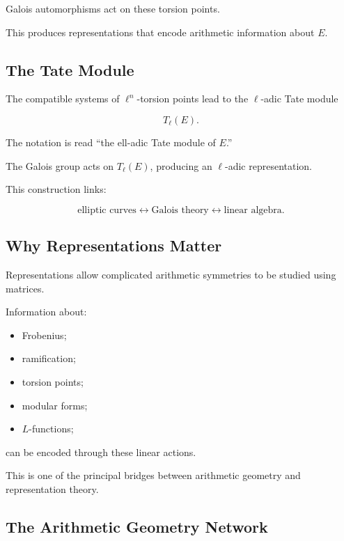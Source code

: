Galois automorphisms act on these torsion points.

This produces representations that encode arithmetic information about
\(E\).

\subsection{The Tate Module}
\label{subsec:tate-module-introduction}

The compatible systems of \(\ell^n\)-torsion points lead to the
\(\ell\)-adic Tate module

\[ T_\ell(E). \]

The notation is read ``the ell-adic Tate module of \(E\).''

The Galois group acts on \(T_\ell(E)\), producing an \(\ell\)-adic
representation.

This construction links:

\[
\boxed{
\text{elliptic curves}
\longleftrightarrow
\text{Galois theory}
\longleftrightarrow
\text{linear algebra}.
}
\]

\subsection{Why Representations Matter}
\label{subsec:why-galois-representations-matter}

Representations allow complicated arithmetic symmetries to be studied using
matrices.

Information about:

\begin{itemize}
    \item Frobenius;
    \item ramification;
    \item torsion points;
    \item modular forms;
    \item \(L\)-functions;
\end{itemize}

can be encoded through these linear actions.

This is one of the principal bridges between arithmetic geometry and
representation theory.

\subsection{The Arithmetic Geometry Network}
\label{subsec:arithmetic-geometry-network}

